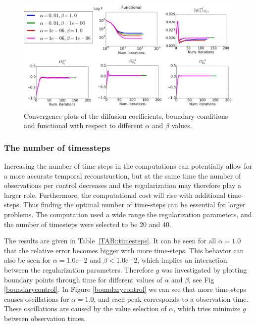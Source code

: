 \documentclass[11pt,a4paper]{article}
\begin{document}
\begin{figure}
\centering
\includegraphics[scale=0.18]{Convergence-plot.png}   
\caption{Convergence plots of the diffusion coefficients, boundary conditions and functional with respect to different $\alpha$ and $\beta$ values. } 
\label{convergence}
\end{figure}

\subsubsection{The number of timessteps}
Increasing the number of time-steps in the computations can potentially allow for a more accurate temporal reconstruction, but at the same time the number of observations per control decreases and the regularization may therefore play a larger role. Furthermore, the computational cost will rise with additional time-steps. Thus finding the optimal number of time-steps can be essential for larger problems. The computation used a wide range the regularization parameters, and the number of timesteps were selected to be 20 and 40.

The results are given in Table~\ref{TAB::timesteps}. It can be seen for all $\alpha=1.0$ that the relative error becomes bigger with more time-steps. This behavior can also be seen for $\alpha=1.0\mathrm{e}{-2}$ and $\beta < 1.0\mathrm{e}{-2}$, which implies an interaction between the regularization parameters. Therefore $g$ was investigated by plotting boundary points through time for different values of $\alpha$ and $\beta$, see Fig \ref{boundarycontrol}. In Figure \ref{boundarycontrol} we can see that more time-steps causes oscillations for $\alpha=1.0$, and each peak corresponds to a observation time. These oscillations are caused by the value selection of $\alpha$, which tries minimize $g$ between observation times.

\end{document}

